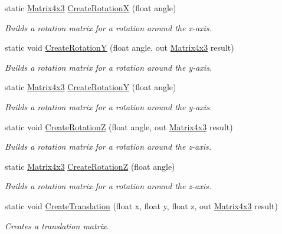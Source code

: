 \begin{DoxyCompactItemize}
static \hyperlink{struct_open_t_k_1_1_matrix4x3}{Matrix4x3} \hyperlink{struct_open_t_k_1_1_matrix4x3_a6a3f373d07f76b6043562d387a70af8e}{Create\-Rotation\-X} (float angle)
\begin{DoxyCompactList}\small\item\em Builds a rotation matrix for a rotation around the x-\/axis. \end{DoxyCompactList}\item 
static void \hyperlink{struct_open_t_k_1_1_matrix4x3_aeef0361d0c4e93c64c745ba7252403c5}{Create\-Rotation\-Y} (float angle, out \hyperlink{struct_open_t_k_1_1_matrix4x3}{Matrix4x3} result)
\begin{DoxyCompactList}\small\item\em Builds a rotation matrix for a rotation around the y-\/axis. \end{DoxyCompactList}\item 
static \hyperlink{struct_open_t_k_1_1_matrix4x3}{Matrix4x3} \hyperlink{struct_open_t_k_1_1_matrix4x3_a689b37ac2964dc9e7b32053c2e651085}{Create\-Rotation\-Y} (float angle)
\begin{DoxyCompactList}\small\item\em Builds a rotation matrix for a rotation around the y-\/axis. \end{DoxyCompactList}\item 
static void \hyperlink{struct_open_t_k_1_1_matrix4x3_a65ed0974586729efa8b547504b0feb17}{Create\-Rotation\-Z} (float angle, out \hyperlink{struct_open_t_k_1_1_matrix4x3}{Matrix4x3} result)
\begin{DoxyCompactList}\small\item\em Builds a rotation matrix for a rotation around the z-\/axis. \end{DoxyCompactList}\item 
static \hyperlink{struct_open_t_k_1_1_matrix4x3}{Matrix4x3} \hyperlink{struct_open_t_k_1_1_matrix4x3_a8118760b82d11ad0d9349c03876e62f3}{Create\-Rotation\-Z} (float angle)
\begin{DoxyCompactList}\small\item\em Builds a rotation matrix for a rotation around the z-\/axis. \end{DoxyCompactList}\item 
static void \hyperlink{struct_open_t_k_1_1_matrix4x3_aa4f4cef3c7f9e8afe453c94535649136}{Create\-Translation} (float x, float y, float z, out \hyperlink{struct_open_t_k_1_1_matrix4x3}{Matrix4x3} result)
\begin{DoxyCompactList}\small\item\em Creates a translation matrix. \end{DoxyCompactList}\item 

\end{DoxyCompactItemize}

